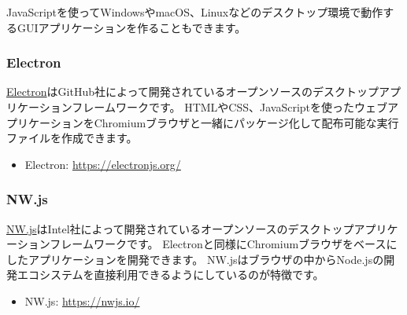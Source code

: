 JavaScriptを使ってWindowsやmacOS、Linuxなどのデスクトップ環境で動作するGUIアプリケーションを作ることもできます。

\hypertarget{electron}{%
\subsubsection{Electron}\label{electron}}

\href{https://electronjs.org/}{Electron}はGitHub社によって開発されているオープンソースのデスクトップアプリケーションフレームワークです。
HTMLやCSS、JavaScriptを使ったウェブアプリケーションをChromiumブラウザと一緒にパッケージ化して配布可能な実行ファイルを作成できます。
\begin{itemize}
\item Electron: \url{https://electronjs.org/}
\end{itemize}

\hypertarget{nwjs}{%
\subsubsection{NW.js}\label{nwjs}}

\href{https://nwjs.io/}{NW.js}はIntel社によって開発されているオープンソースのデスクトップアプリケーションフレームワークです。
Electronと同様にChromiumブラウザをベースにしたアプリケーションを開発できます。
NW.jsはブラウザの中からNode.jsの開発エコシステムを直接利用できるようにしているのが特徴です。
\begin{itemize}
\item NW.js: \url{https://nwjs.io/}
\end{itemize}

